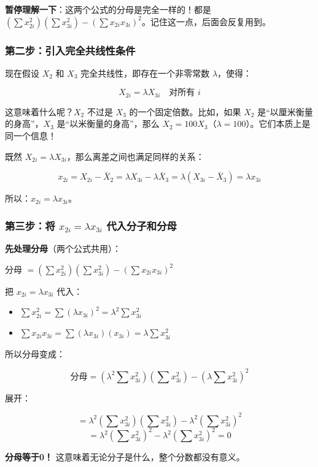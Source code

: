 \documentclass[12pt,a4paper]{ctexart}
\begin{document}
\textbf{暂停理解一下}：这两个公式的分母是完全一样的！都是 $(\sum x_{2i}^2)(\sum x_{3i}^2) - (\sum x_{2i} x_{3i})^2$。记住这一点，后面会反复用到。

\subsubsection{第二步：引入完全共线性条件}

现在假设 $X_2$ 和 $X_3$ 完全共线性，即存在一个非零常数 $\lambda$，使得：

\[
X_{2i} = \lambda X_{3i} \quad \text{对所有 } i
\]

这意味着什么呢？$X_2$ 不过是 $X_3$ 的一个固定倍数。比如，如果 $X_2$ 是“以厘米衡量的身高”，$X_3$ 是“以米衡量的身高”，那么 $X_2 = 100 X_3$（$\lambda = 100$）。它们本质上是同一个信息！

既然 $X_{2i} = \lambda X_{3i}$，那么离差之间也满足同样的关系：

\[
x_{2i} = X_{2i} - \bar{X}_2 = \lambda X_{3i} - \lambda \bar{X}_3 = \lambda(X_{3i} - \bar{X}_3) = \lambda x_{3i}
\]

所以：\textbf{$x_{2i} = \lambda x_{3i}$}。

\subsubsection{第三步：将 $x_{2i} = \lambda x_{3i}$ 代入分子和分母}

\textbf{先处理分母}（两个公式共用）：

分母 $= (\sum x_{2i}^2)(\sum x_{3i}^2) - (\sum x_{2i} x_{3i})^2$

把 $x_{2i} = \lambda x_{3i}$ 代入：
\begin{itemize}
    \item $\sum x_{2i}^2 = \sum (\lambda x_{3i})^2 = \lambda^2 \sum x_{3i}^2$
    \item $\sum x_{2i} x_{3i} = \sum (\lambda x_{3i})(x_{3i}) = \lambda \sum x_{3i}^2$
\end{itemize}

所以分母变成：

\[
\text{分母} = (\lambda^2 \sum x_{3i}^2)(\sum x_{3i}^2) - (\lambda \sum x_{3i}^2)^2
\]

展开：

\[
= \lambda^2 (\sum x_{3i}^2)(\sum x_{3i}^2) - \lambda^2 (\sum x_{3i}^2)^2
\]
\[
= \lambda^2 (\sum x_{3i}^2)^2 - \lambda^2 (\sum x_{3i}^2)^2 = 0
\]

\textbf{分母等于0！} 这意味着无论分子是什么，整个分数都没有意义。
\end{document}
